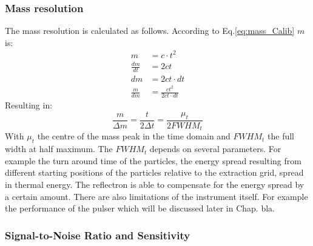 	\subsubsection{Mass resolution} %
	The mass resolution is calculated as follows. According to Eq.\ref{eq:mass_Calib} $m$ is:
	\begin{align*}
		m &= c\cdot t^2\\
		\frac{dm}{dt} &= 2ct\\
		dm &= 2ct\cdot dt\\
		\frac{m}{dm} &= \frac{ct^2}{2ct\cdot dt}
	\end{align*}
	Resulting in:
	\begin{equation}
		\frac{m}{\Delta m} = \frac{t}{2 \Delta t} = \frac{\mu_t}{2 FWHM_t}
		\label{eq:mass_res}
	\end{equation}
	With $\mu_t$ the centre of the mass peak in the time domain and $FWHM_t$ the full width at half maximum. The $FWHM_t$ depends on several parameters. For example the turn around time of the particles, the energy spread resulting from different starting positions of the particles relative to the extraction grid, spread in thermal energy. The reflectron is able to compensate for the energy spread by a certain amount. %
	There are also limitations of the instrument itself. For example the performance of the pulser which will be discussed later in Chap. bla.

	
		
	\subsubsection{Signal-to-Noise Ratio and Sensitivity}
	

